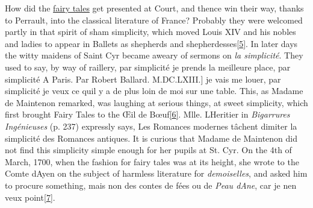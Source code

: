 \documentclass[14pt,a4paper]{memoir}
\newcommand{\ul}[1]{\uline{#1}}
\begin{document}
How did the \ul{fairy tales} get presented at Court, and thence win
their way, thanks to Perrault, into the classical literature of France?
Probably they were welcomed partly in that spirit of sham simplicity,
which moved Louis XIV and his nobles and ladies to appear in Ballets as
shepherds and
shepherdesses\protect\hypertarget{4533318093929944247_33931-h-0.htm.xhtmlux5cux23FNanchor_5}{}{}\protect\hyperlink{4533318093929944247_33931-h-0.htm.xhtmlux5cux23Footnote_5}{{[}5{]}}.
In later days the witty maidens of Saint Cyr became aweary of sermons on
\emph{la simplicité}. They used to say, by way of raillery,
\textquotesingle par simplicité je prends la meilleure
place,\textquotesingle{} \textquotesingle par simplicité A Paris. Par
Robert Ballard. M.DC.LXIII.{]} je vais me louer,\textquotesingle{}
\textquotesingle par simplicité je veux ce qu\textquotesingle il y a de
plus loin de moi sur une table.\textquotesingle{} This, as Madame de
Maintenon remarked, was \textquotesingle laughing at serious
things,\textquotesingle{} at sweet simplicity, which first brought Fairy
Tales to the Œil de
Bœuf\protect\hypertarget{4533318093929944247_33931-h-0.htm.xhtmlux5cux23FNanchor_6}{}{}\protect\hyperlink{4533318093929944247_33931-h-0.htm.xhtmlux5cux23Footnote_6}{{[}6{]}}.
Mlle. L\textquotesingle Heritier in \emph{Bigarrures Ingénieuses} (p.
237) expressly says, \textquotesingle Les Romances modernes tâchent
d\textquotesingle imiter la simplicité des Romances
antiques.\textquotesingle{} It is curious that Madame de Maintenon did
not find this simplicity simple enough for her pupils at St. Cyr. On the
4th of March, 1700, when the fashion for fairy tales was at its height,
she wrote to the Comte d\textquotesingle Ayen on the subject of harmless
literature for \emph{demoiselles}, and asked him to procure something,
\textquotesingle mais non des contes de fées ou de \emph{Peau
d\textquotesingle Ane}, car je n\textquotesingle en veux
point\protect\hypertarget{4533318093929944247_33931-h-0.htm.xhtmlux5cux23FNanchor_7}{}{}\protect\hyperlink{4533318093929944247_33931-h-0.htm.xhtmlux5cux23Footnote_7}{{[}7{]}}.\textquotesingle{}
\end{document}
